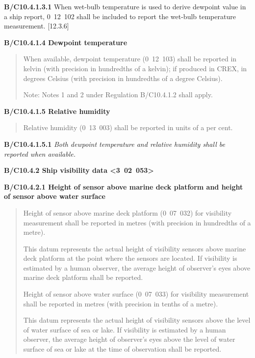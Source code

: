 \textbf{B/C10.4.1.3.1} When wet-bulb temperature is used to derive dewpoint value in a ship report, 0~12~102 shall be included to report the wet-bulb temperature measurement. {[}12.3.6{]}

\textbf{B/C10.4.1.4 Dewpoint temperature}

\begin{quote}
When available, dewpoint temperature (0~12~103) shall be reported in kelvin (with precision in hundredths of a kelvin); if produced in CREX, in degrees Celsius (with precision in hundredths of a degree Celsius).

Note: Notes 1 and 2 under Regulation B/C10.4.1.2 shall apply.
\end{quote}

\textbf{B/C10.4.1.5 Relative humidity}

\begin{quote}
Relative humidity (0~13~003) shall be reported in units of a per cent.
\end{quote}

\textbf{B/C10.4.1.5.1} \emph{Both dewpoint temperature and relative humidity shall be reported when available.}

\textbf{B/C10.4.2 Ship visibility data \textless3~02~053\textgreater{}}

\textbf{B/C10.4.2.1 Height of sensor above marine deck platform and height of sensor above water surface}

\begin{quote}
Height of sensor above marine deck platform (0~07~032) for visibility measurement shall be reported in metres (with precision in hundredths of a metre).

This datum represents the actual height of visibility sensors above marine deck platform at the point where the sensors are located. If visibility is estimated by a human observer, the average height of observer's eyes above marine deck platform shall be reported.

Height of sensor above water surface (0~07~033) for visibility measurement shall be reported in metres (with precision in tenths of a metre).

This datum represents the actual height of visibility sensors above the level of water surface of sea or lake. If visibility is estimated by a human observer, the average height of observer's eyes above the level of water surface of sea or lake at the time of observation shall be reported.
\end{quote}

